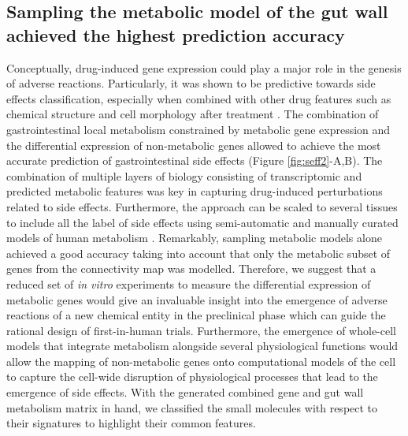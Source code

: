 \subsection{Sampling the metabolic model of the gut wall achieved the highest prediction accuracy}
Conceptually, drug-induced gene expression could play a major role in the genesis of adverse reactions. Particularly, it was shown to be predictive towards side effects classification, especially when combined with other drug features such as chemical structure and cell morphology after treatment \cite{wang2016drug}. The combination of gastrointestinal local metabolism constrained by metabolic gene expression and the differential expression of non-metabolic genes allowed to achieve the most accurate prediction of gastrointestinal side effects (Figure \ref{fig:seff2}-A,B). The combination of multiple layers of biology consisting of transcriptomic and predicted metabolic features was key in capturing drug-induced perturbations related to side effects. Furthermore, the approach can be scaled to several tissues to include all the label of side effects using semi-automatic and manually curated models of human metabolism \cite{schultz2016reconstruction}. Remarkably, sampling metabolic models alone achieved a good accuracy taking into account that only the metabolic subset of genes from the connectivity map was modelled. Therefore, we suggest that a reduced set of \textit{in vitro} experiments to measure the differential expression of metabolic genes would give an invaluable insight into the emergence of adverse reactions of a new chemical entity in the preclinical phase which can guide the rational design of first-in-human trials. Furthermore, the emergence of whole-cell models \cite{karr2012whole,szigeti2017blueprint} that integrate metabolism alongside several physiological functions would allow the mapping of non-metabolic genes onto computational models of the cell to capture the cell-wide disruption of physiological processes that lead to the emergence of side effects. With the generated combined gene and gut wall metabolism matrix in hand, we classified the small molecules with respect to their signatures to highlight their common features.
